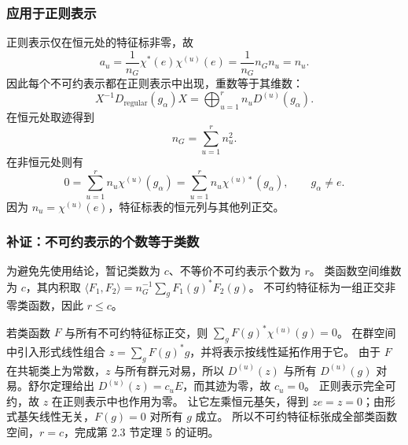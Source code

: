 \subsubsection*{应用于正则表示}
正则表示仅在恒元处的特征标非零，故
\begin{equation}
a_u=\frac1{n_G}\chi^*\left(e\right)\chi^{\left(u\right)}\left(e\right)
=\frac1{n_G}n_Gn_u=n_u.
\end{equation}
因此每个不可约表示都在正则表示中出现，重数等于其维数：
\begin{equation}
X^{-1}D_{\mathrm{regular}}\left(g_\alpha\right)X
=\bigoplus_{u=1}^{r}n_uD^{\left(u\right)}\left(g_\alpha\right).
\end{equation}
在恒元处取迹得到
\begin{equation}
n_G=\sum_{u=1}^{r}n_u^2.
\end{equation}
在非恒元处则有
\begin{equation}
0=\sum_{u=1}^{r}n_u\chi^{\left(u\right)}\left(g_\alpha\right)
=\sum_{u=1}^{r}n_u\chi^{\left(u\right)*}\left(g_\alpha\right),\qquad g_\alpha\ne e.
\end{equation}
因为 $n_u=\chi^{\left(u\right)}\left(e\right)$，特征标表的恒元列与其他列正交。

\subsubsection*{补证：不可约表示的个数等于类数}
为避免先使用结论，暂记类数为 $c$、不等价不可约表示个数为 $r$。
类函数空间维数为 $c$，其内积取
$\langle F_1,F_2\rangle=n_G^{-1}\sum_g F_1\left(g\right)^*F_2\left(g\right)$。
不可约特征标为一组正交非零类函数，因此 $r\leqslant c$。

若类函数 $F$ 与所有不可约特征标正交，则
$\sum_g F\left(g\right)^*\chi^{\left(u\right)}\left(g\right)=0$。
在群空间中引入形式线性组合 $z=\sum_g F\left(g\right)^*g$，并将表示按线性延拓作用于它。
由于 $F$ 在共轭类上为常数，$z$ 与所有群元对易，所以
$D^{\left(u\right)}\left(z\right)$ 与所有 $D^{\left(u\right)}\left(g\right)$ 对易。舒尔定理给出
$D^{\left(u\right)}\left(z\right)=c_uE$，而其迹为零，故 $c_u=0$。
正则表示完全可约，故 $z$ 在正则表示中也作用为零。
让它左乘恒元基矢，得到 $ze=z=0$；由形式基矢线性无关，$F\left(g\right)=0$ 对所有 $g$ 成立。
所以不可约特征标张成全部类函数空间，$r=c$，完成第 2.3 节定理 5 的证明。

